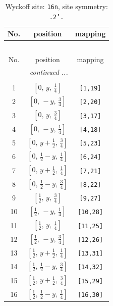 \documentclass[fleqn,8pt]{jsarticle}
\begin{document}
\renewcommand{\arraystretch}{1.2}
\begin{longtable}{ccc}
\caption{Wyckoff site: {\tt 16n}, site symmetry: {\tt .2'.}}
 \\
 \hline \hline
No. & position & mapping \\ \hline \endfirsthead

\multicolumn{2}{l}{\tablename\ \thetable{}} \\
 \hline \hline
No. & position & mapping \\ \hline \endhead

 \hline \hline
\multicolumn{2}{r}{\footnotesize\it continued ...} \\ \endfoot

 \hline \hline
\multicolumn{2}{r}{} \\ \endlastfoot

1 & $\left[ 0,\, y,\, \frac{1}{4} \right]$ & {\tt [1,19]} \\ \hline
2 & $\left[ 0,\, - y,\, \frac{3}{4} \right]$ & {\tt [2,20]} \\ \hline
3 & $\left[ 0,\, y,\, \frac{3}{4} \right]$ & {\tt [3,17]} \\ \hline
4 & $\left[ 0,\, - y,\, \frac{1}{4} \right]$ & {\tt [4,18]} \\ \hline
5 & $\left[ 0,\, y + \frac{1}{2},\, \frac{3}{4} \right]$ & {\tt [5,23]} \\ \hline
6 & $\left[ 0,\, \frac{1}{2} - y,\, \frac{1}{4} \right]$ & {\tt [6,24]} \\ \hline
7 & $\left[ 0,\, y + \frac{1}{2},\, \frac{1}{4} \right]$ & {\tt [7,21]} \\ \hline
8 & $\left[ 0,\, \frac{1}{2} - y,\, \frac{3}{4} \right]$ & {\tt [8,22]} \\ \hline
9 & $\left[ \frac{1}{2},\, y,\, \frac{3}{4} \right]$ & {\tt [9,27]} \\ \hline
10 & $\left[ \frac{1}{2},\, - y,\, \frac{1}{4} \right]$ & {\tt [10,28]} \\ \hline
11 & $\left[ \frac{1}{2},\, y,\, \frac{1}{4} \right]$ & {\tt [11,25]} \\ \hline
12 & $\left[ \frac{1}{2},\, - y,\, \frac{3}{4} \right]$ & {\tt [12,26]} \\ \hline
13 & $\left[ \frac{1}{2},\, y + \frac{1}{2},\, \frac{1}{4} \right]$ & {\tt [13,31]} \\ \hline
14 & $\left[ \frac{1}{2},\, \frac{1}{2} - y,\, \frac{3}{4} \right]$ & {\tt [14,32]} \\ \hline
15 & $\left[ \frac{1}{2},\, y + \frac{1}{2},\, \frac{3}{4} \right]$ & {\tt [15,29]} \\ \hline
16 & $\left[ \frac{1}{2},\, \frac{1}{2} - y,\, \frac{1}{4} \right]$ & {\tt [16,30]} \\
\end{longtable}
\end{document}
